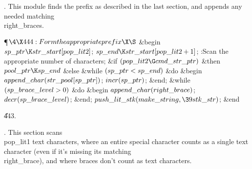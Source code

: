 .
This module finds the prefix as described in the last section, and
appends any needed matching \\{right\_brace}s.

\Y\P$\4\X444:Form the appropriate prefix\X\S$\6
\&{begin} $\\{sp\_ptr}\K\\{str\_start}[\\{pop\_lit2}]$;\5
$\\{sp\_end}\K\\{str\_start}[\\{pop\_lit2}+1]$;\6
:Scan the appropriate number of characters\X;\6
\&{if} $(\\{pop\_lit2}\G\\{cmd\_str\_ptr})$ \1\&{then}\6
$\\{pool\_ptr}\K\\{sp\_end}$\6
\4\&{else} \&{while} $(\\{sp\_ptr}<\\{sp\_end})$ \1\&{do}\6
\&{begin} $\\{append\_char}(\\{str\_pool}[\\{sp\_ptr}])$;\5
$\\{incr}(\\{sp\_ptr})$;\6
\&{end};\2\2\6
\&{while} $(\\{sp\_brace\_level}>0)$ \1\&{do}%
\6
\&{begin} $\\{append\_char}(\\{right\_brace})$;\5
$\\{decr}(\\{sp\_brace\_level})$;\6
\&{end};\2\6
$\\{push\_lit\_stk}(\\{make\_string},\39\\{stk\_str})$;\6
\&{end}\par
\U443.\fi

.
This section scans \\{pop\_lit1} text characters, where an entire special
character counts as a single text character (even if it's missing its
matching \\{right\_brace}), and where braces don't count as text
characters.


